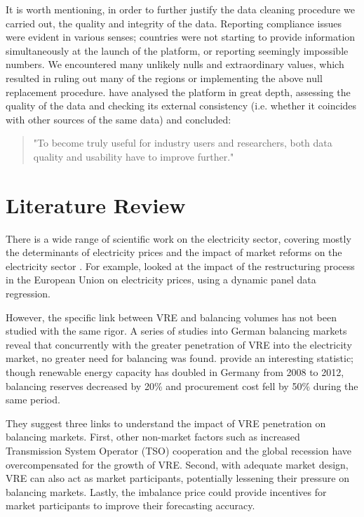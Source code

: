 \documentclass[12pt]{article}
\begin{document}
It is worth mentioning, in order to further justify the data cleaning procedure we carried out, the quality and integrity of the data. Reporting compliance issues were evident in various senses; countries were not starting to provide information simultaneously at the launch of the platform, or reporting seemingly impossible numbers. We encountered many unlikely nulls and extraordinary values, which resulted in ruling out many of the regions or implementing the above null replacement procedure. \citet{Hirth2018} have analysed the platform in great depth, assessing the quality of the data and checking its external consistency (i.e. whether it coincides with other sources of the same data) and concluded: \begin{quote} "To become truly useful for industry users and researchers, both data quality and usability have to improve further."
\end{quote}

\section{Literature Review}
\label{section:Literature}
There is a wide range of scientific work on the electricity sector, covering mostly the determinants of electricity prices \citep{kyritsis2017,gil2013} and the impact of market reforms on the electricity sector \citep{erdogdu2011}. For example, \citet{hyland2016} looked at the impact of the restructuring process in the European Union on electricity prices, using a dynamic panel data regression.

However, the specific link between VRE and balancing volumes has not been studied with the same rigor. A series of studies into German balancing markets reveal that concurrently with the greater penetration of VRE into the electricity market, no greater need for balancing was found. \citet{Hirth2015a} provide an interesting statistic; though renewable energy capacity has doubled in Germany from 2008 to 2012, balancing reserves decreased by 20\% and procurement cost fell by 50\% during the same period.\par

They suggest three links to understand the impact of VRE penetration on balancing markets. First, other non-market factors such as increased Transmission System Operator (TSO) cooperation and the global recession have overcompensated for the growth of VRE. Second, with adequate market design, VRE can also act as market participants, potentially lessening their pressure on balancing markets. Lastly, the imbalance price could provide incentives for market participants to improve their forecasting accuracy.\par
\end{document}
